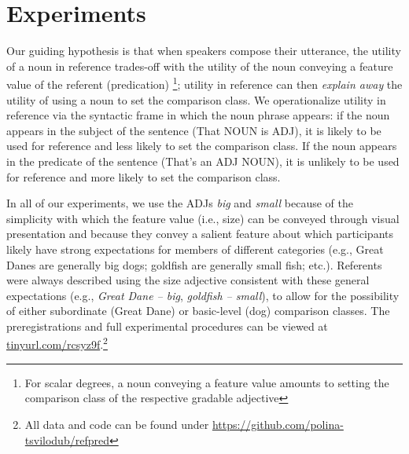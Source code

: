 \documentclass[10pt,letterpaper]{article}
\begin{document}
\section{Experiments}
Our guiding hypothesis is that when speakers compose their utterance, the utility of a noun in reference trades-off with the utility of the noun conveying a feature value of the referent (predication) \footnote{For scalar degrees, a noun conveying a feature value amounts to setting the comparison class of the respective gradable adjective}; utility in reference can then \emph{explain away} the utility of using a noun to set the comparison class. 
We operationalize utility in reference via the syntactic frame in which the noun phrase appears: if the noun appears in the subject of the sentence (That NOUN is ADJ), it is likely to be used for reference and less likely to set the comparison class. If the noun appears in the predicate of the sentence (That's an ADJ NOUN), it is unlikely to be used for reference and more likely to set the comparison class. 

In all of our experiments, we use the ADJs \emph{big} and \emph{small} because of the simplicity with which the feature value (i.e., size) can be conveyed through visual presentation and because they convey a salient feature about which participants likely have strong expectations for members of different categories (e.g., Great Danes are generally big dogs; goldfish are generally small fish; etc.). 
Referents were always described using the size adjective consistent with these general expectations (e.g., \emph{Great Dane -- big}, \emph{goldfish -- small}), to allow for the possibility of either subordinate (Great Dane) or basic-level (dog) comparison classes.
The preregistrations and full experimental procedures can be viewed at \url{tinyurl.com/rcsyz9f}.\footnote{All data and code can be found under \url{https://github.com/polina-tsvilodub/refpred}}

\end{document}
